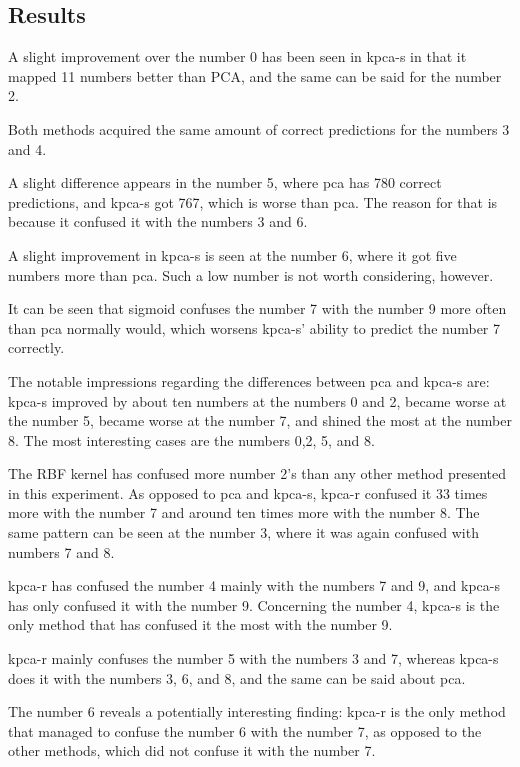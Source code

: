 \subsection{Results}
A slight improvement over the number 0 has been seen in \gls{kpca-s} in that it mapped 11 numbers better than PCA, and the same can be said for the number 2.

Both methods acquired the same amount of correct predictions for the numbers 3 and 4.

A slight difference appears in the number 5, where \gls{pca} has 780 correct predictions, and \gls{kpca-s} got 767, which is worse than \gls{pca}. The reason for that is because it confused it with the numbers 3 and 6.


A slight improvement in \gls{kpca-s} is seen at the number 6, where it got five numbers more than \gls{pca}. Such a low number is not worth considering, however.

It can be seen that sigmoid confuses the number 7 with the number 9 more often than \gls{pca} normally would, which worsens \gls{kpca-s}' ability to predict the number 7 correctly.

The notable impressions regarding the differences between \gls{pca} and \gls{kpca-s} are: \gls{kpca-s} improved by about ten numbers at the numbers 0 and 2, became worse at the number 5, became worse at the number 7, and shined the most at the number 8. The most interesting cases are the numbers 0,2, 5, and 8.


The RBF kernel has confused more number 2's than any other method presented in this experiment. As opposed to \gls{pca} and \gls{kpca-s}, \gls{kpca-r} confused it 33 times more with the number 7 and around ten times more with the number 8. The same pattern can be seen at the number 3, where it was again confused with numbers 7 and 8.


\gls{kpca-r} has confused the number 4 mainly with the numbers 7 and 9, and \gls{kpca-s} has only confused it with the number 9. Concerning the number 4, \gls{kpca-s} is the only method that has confused it the most with the number 9.


\gls{kpca-r} mainly confuses the number 5 with the numbers 3 and 7, whereas \gls{kpca-s} does it with the numbers 3, 6, and 8, and the same can be said about \gls{pca}.

The number 6 reveals a potentially interesting finding: \gls{kpca-r} is the only method that managed to confuse the number 6 with the number 7, as opposed to the other methods, which did not confuse it with the number 7.

